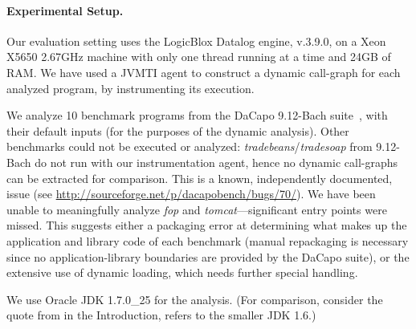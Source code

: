 \paragraph{Experimental Setup.}
Our evaluation setting uses the LogicBlox Datalog engine, v.3.9.0, on
a Xeon X5650 2.67GHz machine with only one thread running at a time
and 24GB of RAM. We have used a JVMTI agent to construct a dynamic
call-graph for each analyzed program, by instrumenting its execution.

We analyze 10 benchmark programs from the DaCapo 9.12-Bach
suite~\cite{dacapo:paper}, with their default inputs (for the purposes
of the dynamic analysis). Other benchmarks could not be executed or
analyzed: \emph{tradebeans}/\emph{tradesoap} from 9.12-Bach do not run
with our instrumentation agent, hence no dynamic call-graphs can be
extracted for comparison. This is a known, independently documented,
issue (see {\small
  \url{http://sourceforge.net/p/dacapobench/bugs/70/}}). We have been
unable to meaningfully analyze \emph{fop} and
\emph{tomcat}---significant entry points were missed. This suggests
either a packaging error at determining what makes up the application
and library code of each benchmark (manual repackaging is necessary
since no application-library boundaries are provided by the DaCapo
suite), or the extensive use of dynamic loading, which needs further
special handling.

We use Oracle JDK 1.7.0\_25 for the analysis.  
(For comparison, consider the quote from \cite{www:wala-reflection} in the
Introduction, refers to the smaller JDK 1.6.)



 


